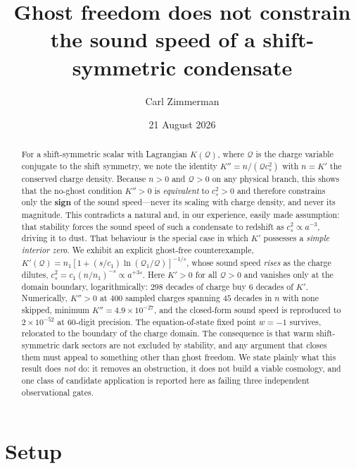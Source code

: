 \documentclass[aps,prd,twocolumn,superscriptaddress,nofootinbib,floatfix]{revtex4-2}
\begin{document}
\title{Ghost freedom does not constrain the sound speed of a shift-symmetric condensate}

\author{Carl Zimmerman}
\date{21 August 2026}

\begin{abstract}
For a shift-symmetric scalar with Lagrangian $K(\mathcal{Q})$, where $\mathcal{Q}$ is the
charge variable conjugate to the shift symmetry, we note the identity
$K'' = n/(\mathcal{Q}c_s^2)$ with $n = K'$ the conserved charge density. Because $n>0$ and
$\mathcal{Q}>0$ on any physical branch, this shows that the no-ghost condition $K''>0$ is
\emph{equivalent} to $c_s^2>0$ and therefore constrains only the \textbf{sign} of the sound
speed---never its scaling with charge density, and never its magnitude. This contradicts a
natural and, in our experience, easily made assumption: that stability forces the sound speed
of such a condensate to redshift as $c_s^2\propto a^{-3}$, driving it to dust. That behaviour
is the special case in which $K'$ possesses a \emph{simple interior zero}. We exhibit an
explicit ghost-free counterexample,
$K'(\mathcal{Q}) = n_1[1+(s/c_1)\ln(\mathcal{Q}_1/\mathcal{Q})]^{-1/s}$, whose sound speed
\emph{rises} as the charge dilutes, $c_s^2 = c_1(n/n_1)^{-s}\propto a^{+3s}$. Here $K'>0$ for
all $\mathcal{Q}>0$ and vanishes only at the domain boundary, logarithmically: $298$ decades
of charge buy $6$ decades of $K'$. Numerically, $K''>0$ at $400$ sampled charges spanning
$45$ decades in $n$ with none skipped, minimum $K''=4.9\times10^{-27}$, and the closed-form
sound speed is reproduced to $2\times10^{-52}$ at $60$-digit precision. The equation-of-state
fixed point $w=-1$ survives, relocated to the boundary of the charge domain. The consequence
is that warm shift-symmetric dark sectors are not excluded by stability, and any argument
that closes them must appeal to something other than ghost freedom. We state plainly what
this result does \emph{not} do: it removes an obstruction, it does not build a viable
cosmology, and one class of candidate application is reported here as failing three
independent observational gates.
\end{abstract}

\maketitle

\section{Setup}
\end{document}
